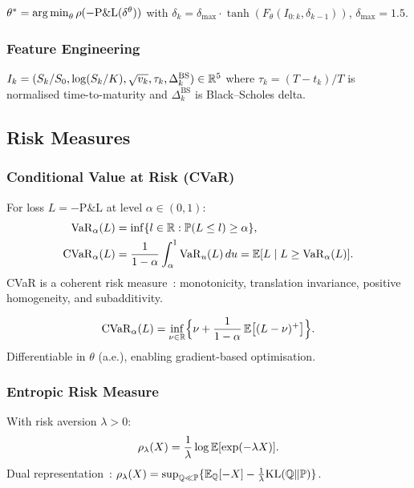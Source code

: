 $\theta^* = \operatorname*{arg\,min}_\theta \rho(-\mathrm{P\&L}(\delta^\theta))$ with $\delta_k = \delta_{\max} \cdot \tanh(F_\theta(I_{0:k}, \delta_{k-1}))$, $\delta_{\max} = 1.5$.

\subsubsection{Feature Engineering}

$I_k = (S_k/S_0, \log(S_k/K), \sqrt{v_k}, \tau_k, \Delta_k^{\mathrm{BS}}) \in \mathbb{R}^5$ where $\tau_k = (T-t_k)/T$ is normalised time-to-maturity and $\Delta_k^{\mathrm{BS}}$ is Black--Scholes delta.

\subsection{Risk Measures}

\subsubsection{Conditional Value at Risk (CVaR)}

\begin{definition}[CVaR]
For loss $L = -\mathrm{P\&L}$ at level $\alpha \in (0,1)$:
\begin{align}
    \mathrm{VaR}_\alpha(L) &= \inf\{l \in \mathbb{R} : \mathbb{P}(L \le l) \ge \alpha\}, \\
    \mathrm{CVaR}_\alpha(L) &= \frac{1}{1-\alpha}\int_\alpha^1 \mathrm{VaR}_u(L)\,du = \mathbb{E}[L \mid L \geq \mathrm{VaR}_\alpha(L)].
\end{align}
CVaR is a coherent risk measure~\citep{artzner1999coherent}: monotonicity, translation invariance, positive homogeneity, and subadditivity.
\end{definition}

\begin{proposition}
\begin{equation}
    \mathrm{CVaR}_\alpha(L) = \inf_{\nu \in \mathbb{R}}\Bigl\{\nu + \frac{1}{1-\alpha}\,\mathbb{E}\bigl[(L-\nu)^+\bigr]\Bigr\}.
\end{equation}
Differentiable in $\theta$ (a.e.), enabling gradient-based optimisation.
\end{proposition}

\subsubsection{Entropic Risk Measure}

\begin{definition}
With risk aversion $\lambda > 0$:
\begin{equation}
    \rho_\lambda(X) = \frac{1}{\lambda}\log\mathbb{E}[\exp(-\lambda X)].
\end{equation}
Dual representation~\citep{follmer2002convex}: $\rho_\lambda(X) = \sup_{\mathbb{Q} \ll \mathbb{P}}\{\mathbb{E}_{\mathbb{Q}}[-X] - \frac{1}{\lambda}\mathrm{KL}(\mathbb{Q}\|\mathbb{P})\}$.
\end{definition}

